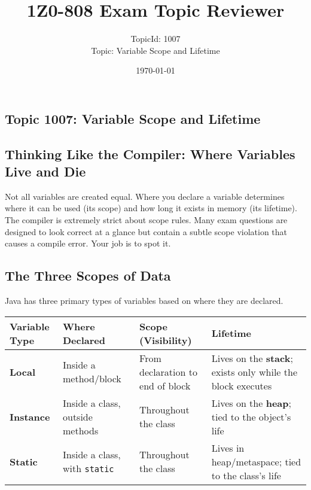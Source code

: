 \documentclass[12pt]{article}
\title{\textbf{1Z0-808 Exam Topic Reviewer}}
\author{TopicId: 1007 \\ Topic: Variable Scope and Lifetime}
\date{\today}
\begin{document}
\maketitle
\newpage\begin{enumerate}[label=(\arabic*)]
\section*{Topic 1007: Variable Scope and Lifetime}

\subsection*{Thinking Like the Compiler: Where Variables Live and Die}
Not all variables are created equal. Where you declare a variable determines where it can be used (its scope) and how long it exists in memory (its lifetime). The compiler is extremely strict about scope rules. Many exam questions are designed to look correct at a glance but contain a subtle scope violation that causes a compile error. Your job is to spot it.

\subsection*{The Three Scopes of Data}
Java has three primary types of variables based on where they are declared.

\begin{tabular}{|l|l|l|l|}
\hline
\textbf{Variable Type} & \textbf{Where Declared} & \textbf{Scope (Visibility)} & \textbf{Lifetime} \\
\hline
\textbf{Local} & Inside a method/block & From declaration to end of block & Lives on the \textbf{stack}; exists only while the block executes \\
\hline
\textbf{Instance} & Inside a class, outside methods & Throughout the class & Lives on the \textbf{heap}; tied to the object's life \\
\hline
\textbf{Static} & Inside a class, with \texttt{static} & Throughout the class & Lives in heap/metaspace; tied to the class's life \\
\hline
\end{tabular}


\end{enumerate}
\end{document}

